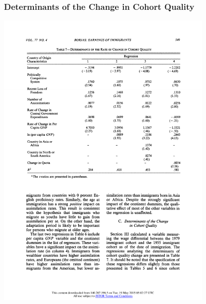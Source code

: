 \documentclass[10pt]{beamer}
\begin{document}
\begin{frame}[c]\frametitle{Determinants of the Change in Cohort Quality}

\centerline{\includegraphics[width=0.8\textwidth]{DetReg3.pdf}}

\end{frame}
\end{document}

